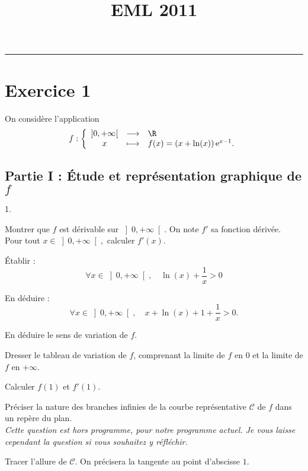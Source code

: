 \documentclass[11pt]{article}%
\title{\bf \vspace{-1cm} EML 2011} %
\author{} %
\date{} %
\begin{document}
\maketitle %
\vspace{-1.2cm}\hrule %
\thispagestyle{fancy}

\vspace*{.4cm}


\section*{Exercice 1}

\noindent
On considère l'application
\[
f : \left\{
\begin{array}{ccl}
\left] 0, + \infty \right[ & \longrightarrow & \R
\\
x & \longmapsto & f(x) = \left( x + \ln (x)\right) \ee^{x-1}.
\end{array}
\right.
\]


\subsection*{Partie I : Étude et représentation graphique de $f$}

\begin{noliste}{1.}
 \setlength{\itemsep}{4mm}
\item Montrer que $f$ est dérivable sur $\left] 0, + \infty \right[ $.
On note $f'$ sa fonction dérivée.\\
Pour tout $x\in \left] 0, + \infty \right[,$ calculer $f'(x)$.

\item Établir :
\[
\forall x\in \left] 0, + \infty \right[,\quad \ln( x) + \frac{1}{x}>0
\]


\item En déduire :
\[
\forall x\in \left] 0, + \infty \right[,\quad x + \ln(x) + 1 +
\frac{1}{x}>0.
\]


\item En déduire le sens de variation de $f$.

\item Dresser le tableau de variation de $f$, comprenant la limite de
$f$ en
$0$ et la limite de $f$ en $ + \infty$.

Calculer $f\left( 1\right) $ et $f'\left( 1\right).$

\item Préciser la nature des branches infinies de la courbe
représentative $\mathcal{C}$ de $f$ dans un repère du plan.\\
\emph{Cette question est hors programme, pour notre programme actuel. 
Je vous laisse cependant la question si vous souhaitez y réfléchir.}

\item Tracer l'allure de $\mathcal{C}$. On précisera la tangente au 
point d'abscisse $1$.
\end{noliste}
\end{document}
